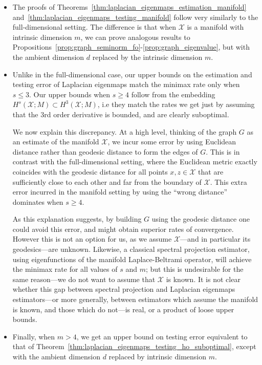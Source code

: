 \documentclass{article}
\newcommand{\1}{\mathbf{1}}
\newcommand{\mc}[1]{\mathcal{#1}}
\theoremstyle{alden}
\theoremstyle{aldenthm}
\theoremstyle{definition}
\theoremstyle{remark}
\begin{document}
\begin{itemize}
	\item The proofs of Theorems~\ref{thm:laplacian_eigenmaps_estimation_manifold} and~\ref{thm:laplacian_eigenmaps_testing_manifold} follow very similarly to the full-dimensional setting. The difference is that when $\mc{X}$ is a manifold with intrinsic dimension $m$, we can prove analogous results to Propositions~\ref{prop:graph_seminorm_fo}-\ref{prop:graph_eigenvalue}, but with the ambient dimension $d$ replaced by the intrinsic dimension $m$. 
	\item Unlike in the full-dimensional case, our upper bounds on the estimation and testing error of Laplacian eigenmaps match the minimax rate only when $s \leq 3$.  Our upper bounds when $s \geq 4$ follow from the embedding $H^s(\mc{X};M) \subset H^{3}(\mc{X};M)$, i.e they match the rates we get just by assuming that the $3$rd order derivative is bounded, and are clearly suboptimal.
	
	We now explain this discrepancy. At a high level, thinking of the graph $G$ as an estimate of the manifold $\mc{X}$, we incur some error by using Euclidean distance rather than geodesic distance to form the edges of $G$. This is in contrast with the full-dimensional setting, where the Euclidean metric exactly coincides with the geodesic distance for all points $x,z \in \mc{X}$ that are sufficiently close to each other and far from the boundary of $\mc{X}$. This extra error incurred in the manifold setting by using the ``wrong distance'' dominates when $s \geq 4$. 
	
	As this explanation suggests, by building $G$ using the geodesic distance one could avoid this error, and might obtain superior rates of convergence. However this is not an option for us, as we assume $\mc{X}$---and in particular its geodesics---are unknown. Likewise, a classical spectral projection estimator, using eigenfunctions of the manifold Laplace-Beltrami operator, will achieve the minimax rate for all values of $s$ and $m$; but this is undesirable for the same reason---we do not want to assume that $\mc{X}$ is known. It is not clear whether this gap between spectral projection and Laplacian eigenmaps estimators---or more generally, between estimators which assume the manifold is known, and those which do not---is real, or a product of loose upper bounds. 
	
	\item Finally, when $m > 4$, we get an upper bound on testing error equivalent to that of Theorem~\ref{thm:laplacian_eigenmaps_testing_ho_suboptimal}, except with the ambient dimension $d$ replaced by intrinsic dimension $m$.
\end{itemize}
\end{document}
